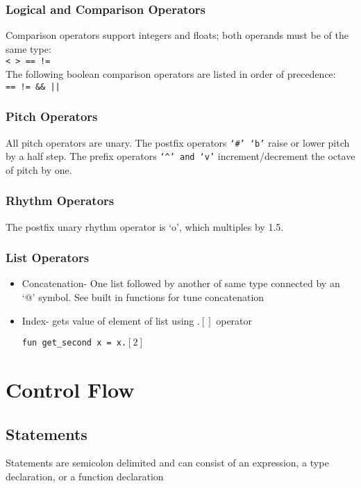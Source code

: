 \documentclass[12pt]{report}
\begin{document}
\subsection{Logical and Comparison Operators}

Comparison operators support integers and floats; both operands must be of the same type: \\ \texttt{< > == !=} \\
The following boolean comparison operators are listed in order of precedence: \\\texttt{== != \&\& ||} 

\subsection{Pitch Operators}

All pitch operators are unary. The postfix operators \texttt{`\#' `b'} raise or lower pitch by a half step. The prefix operators \texttt{`\textasciicircum' and `v'} increment/decrement the octave of pitch by one.


\subsection{Rhythm Operators}
The postfix unary rhythm operator is `o', which multiples by 1.5. 

\subsection{List Operators}

\begin{itemize}

\item Concatenation- One list followed by another of same type connected by an `@' symbol. See built in functions for tune concatenation 

\item Index- gets value of element of list using $.[]$ operator 

\texttt{fun get\_second x =  x.$[2]$}

\end{itemize}

\chapter{Control Flow}

\section{Statements}
Statements are semicolon delimited and can consist of an expression, a type declaration, or a function declaration
\end{document}

